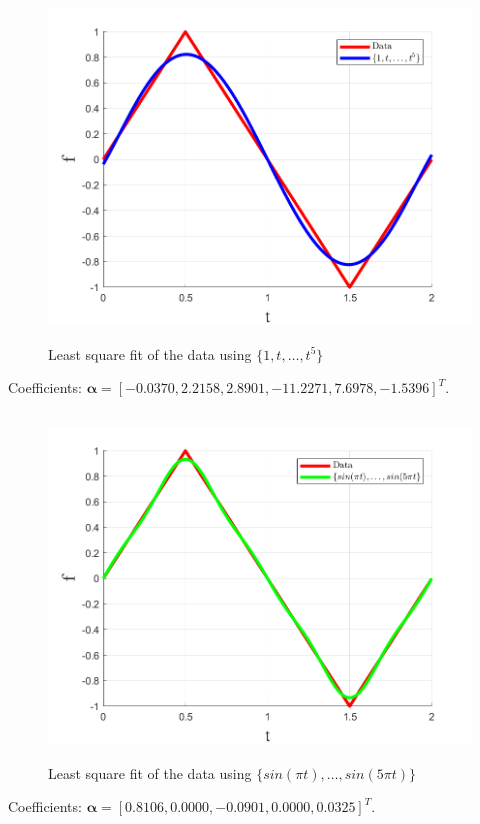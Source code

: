 \documentclass{article}
\theoremstyle{definition} %
\begin{document}
\section{}

\subsection{}
\begin{figure}[H]
    \centering
        \textsf{\includegraphics[width=0.6\columnwidth]{hw5-prob4-fig1.png}}
        \caption{Least square fit of the data using $\{1, t, \dots, t^5\}$}
        \label{fig: 4-1}
\end{figure}

Coefficients: $\boldsymbol \alpha =[
-0.0370,
 2.2158,
 2.8901,
-11.2271,
 7.6978,
-1.5396]^T.
$

\subsection{}
\begin{figure}[H]
    \centering
        \textsf{\includegraphics[width=0.6\columnwidth]{hw5-prob4-fig2.png}}
        \caption{Least square fit of the data using $\{sin(\pi t), \dots, sin(5\pi t)\}$}
        \label{fig: 4-2}
\end{figure}

Coefficients: $\boldsymbol \alpha =[
    0.8106,
    0.0000,
   -0.0901,
    0.0000,
    0.0325]^T.
$
\end{document}

